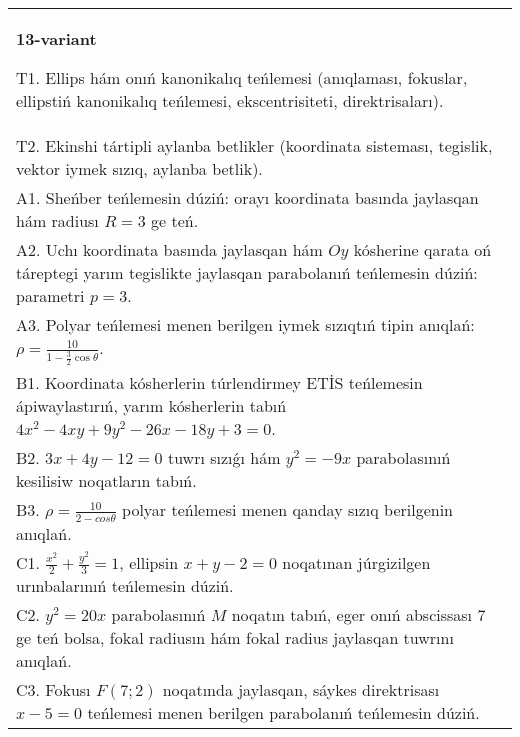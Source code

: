 \documentclass{article}
\begin{document}
\begin{tabular}{m{17cm}}
\textbf{13-variant}
\newline

T1. Ellips hám onıń kanonikalıq teńlemesi (anıqlaması, fokuslar, ellipstiń kanonikalıq teńlemesi, ekscentrisiteti, direktrisaları).\\

T2. Ekinshi tártipli aylanba betlikler (koordinata sisteması, tegislik, vektor iymek sızıq, aylanba betlik).\\

A1. Sheńber teńlemesin dúziń: orayı koordinata basında jaylasqan hám radiusı $R=3$ ge teń.\\

A2. Uchı koordinata basında jaylasqan hám $Oy$ kósherine qarata oń táreptegi yarım tegislikte jaylasqan parabolanıń teńlemesin dúziń: parametri $p=3$.\\

A3. Polyar teńlemesi menen berilgen iymek sızıqtıń tipin anıqlań: $\rho=\frac{10}{1-\frac{3}{2}\cos\theta}$.\\

B1. Koordinata kósherlerin túrlendirmey ETİS teńlemesin ápiwaylastırıń, yarım kósherlerin tabıń $4x^{2} - 4xy + 9y^{2} - 26x - 18y + 3 = 0$.\\

B2. $3x + 4y - 12 = 0$ tuwrı sızıǵı hám $y^{2} = - 9x$ parabolasınıń kesilisiw noqatların tabıń.  \\

B3. $\rho = \frac{10}{2 - cos\theta}$ polyar teńlemesi menen qanday sızıq berilgenin anıqlań.  \\

C1. $\frac{x^{2}}{2} + \frac{y^{2}}{3} = 1$, ellipsin $x + y - 2 = 0$ noqatınan júrgizilgen urınbalarınıń teńlemesin dúziń.  \\

C2. $y^{2} = 20x$ parabolasınıń $M$ noqatın tabıń, eger onıń abscissası 7 ge teń bolsa, fokal radiusın hám fokal radius jaylasqan tuwrını anıqlań.\\

C3. Fokusı $F(7;2)$ noqatında jaylasqan, sáykes direktrisası $x - 5 = 0$ teńlemesi menen berilgen parabolanıń teńlemesin dúziń.  \\

\end{tabular}
\vspace{1cm}
\end{document}
